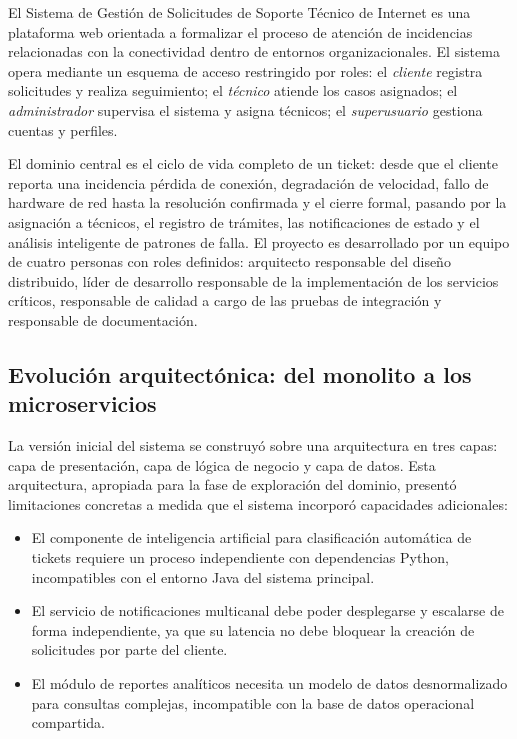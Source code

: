 \documentclass[12pt, a4paper]{article}
\begin{document}
El Sistema de Gestión de Solicitudes de Soporte Técnico de Internet es una
plataforma web orientada a formalizar el proceso de atención de incidencias
relacionadas con la conectividad dentro de entornos organizacionales. El sistema
opera mediante un esquema de acceso restringido por roles: el \textit{cliente}
registra solicitudes y realiza seguimiento; el \textit{técnico} atiende los casos
asignados; el \textit{administrador} supervisa el sistema y asigna técnicos; el
\textit{superusuario} gestiona cuentas y perfiles.

El dominio central es el ciclo de vida completo de un ticket: desde que el cliente
reporta una incidencia pérdida de conexión, degradación de velocidad, fallo de
hardware de red hasta la resolución confirmada y el cierre formal, pasando por
la asignación a técnicos, el registro de trámites, las notificaciones de estado y
el análisis inteligente de patrones de falla.
\newpage
El proyecto es desarrollado por un equipo de cuatro personas con roles definidos:
arquitecto responsable del diseño distribuido, líder de desarrollo responsable de
la implementación de los servicios críticos, responsable de calidad a cargo de las
pruebas de integración y responsable de documentación.

\subsection{Evolución arquitectónica: del monolito a los microservicios}

La versión inicial del sistema se construyó sobre una arquitectura en tres capas:
capa de presentación, capa de lógica de negocio y capa de datos. Esta arquitectura,
apropiada para la fase de exploración del dominio, presentó limitaciones concretas
a medida que el sistema incorporó capacidades adicionales:

\begin{itemize}
  \item El componente de inteligencia artificial para clasificación automática de
        tickets requiere un proceso independiente con dependencias Python,
        incompatibles con el entorno Java del sistema principal.
  \item El servicio de notificaciones multicanal debe poder desplegarse y escalarse
        de forma independiente, ya que su latencia no debe bloquear la creación
        de solicitudes por parte del cliente.
  \item El módulo de reportes analíticos necesita un modelo de datos desnormalizado
        para consultas complejas, incompatible con la base de datos operacional
        compartida.
\end{itemize}
\end{document}
